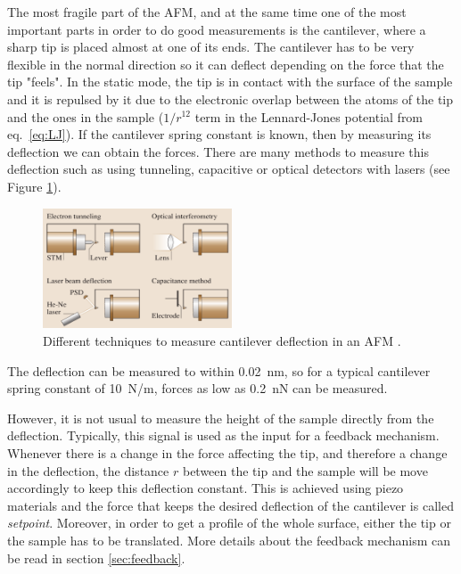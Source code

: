 \documentclass[11pt,a4paper]{article}
\begin{document}
The most fragile part of the AFM, and at the same time one of the most important parts in order to do good measurements is the cantilever, where a sharp tip is placed almost at one of its ends. The cantilever has to be very flexible in the normal direction so it can deflect depending on the force that the tip "feels". In the static mode, the tip is in contact with the surface of the sample and it is repulsed by it due to the electronic overlap between the atoms of the tip and the ones in the sample ($1/r^{12}$ term in the Lennard-Jones potential from eq.~\eqref{eq:LJ}). If the cantilever spring constant is known, then by measuring its deflection we can obtain the forces. There are many methods to measure this deflection such as using tunneling, capacitive or optical detectors with lasers (see Figure \ref{fig:Deflection_measurement}).

\begin{figure}[ht]
\centering
\includegraphics[width=0.5\textwidth]{Deflection}
\caption{Different techniques to measure cantilever deflection in an AFM \cite{Bhushan}.}
\label{fig:Deflection_measurement}
\end{figure}

The deflection can be measured to within \SI{0.02}{\nm}, so for a typical cantilever spring constant of \SI{10}{\N/\m}, forces as low as \SI{0.2}{\nano\N} can be measured.

However, it is not usual to measure the height of the sample directly from the deflection. Typically, this signal is used as the input for a feedback mechanism. Whenever there is a change in the force affecting the tip, and therefore a change in the deflection, the distance $r$ between the tip and the sample will be move accordingly to keep this deflection constant. This is achieved using piezo materials and the force that keeps the desired deflection of the cantilever is called \emph{setpoint}. Moreover, in order to get a profile of the whole surface, either the tip or the sample has to be translated. More details about the feedback mechanism can be read in section \ref{sec:feedback}.
\end{document}

